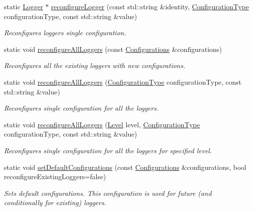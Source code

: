 \begin{DoxyCompactItemize}
static \hyperlink{classel_1_1_logger}{Logger} $\ast$ \hyperlink{classel_1_1_loggers_aef49fdae329cefcc1c01428568dced4b}{reconfigure\+Logger} (const std\+::string \&identity, \hyperlink{namespaceel_a281f5db6d6163678bc68a8b23b59e124}{Configuration\+Type} configuration\+Type, const std\+::string \&value)
\begin{DoxyCompactList}\small\item\em Reconfigures logger\textquotesingle{}s single configuration. \end{DoxyCompactList}\item 
static void \hyperlink{classel_1_1_loggers_ac834df0f5e9e3dab18e70321a2543af7}{reconfigure\+All\+Loggers} (const \hyperlink{classel_1_1_configurations}{Configurations} \&configurations)
\begin{DoxyCompactList}\small\item\em Reconfigures all the existing loggers with new configurations. \end{DoxyCompactList}\item 
static void \hyperlink{classel_1_1_loggers_a1ebd33bc0208b430f41508e34509c7c9}{reconfigure\+All\+Loggers} (\hyperlink{namespaceel_a281f5db6d6163678bc68a8b23b59e124}{Configuration\+Type} configuration\+Type, const std\+::string \&value)
\begin{DoxyCompactList}\small\item\em Reconfigures single configuration for all the loggers. \end{DoxyCompactList}\item 
static void \hyperlink{classel_1_1_loggers_ab24b99e5bb3c907d1418ee3266f15397}{reconfigure\+All\+Loggers} (\hyperlink{namespaceel_ab0ac6091262344c52dd2d3ad099e8e36}{Level} level, \hyperlink{namespaceel_a281f5db6d6163678bc68a8b23b59e124}{Configuration\+Type} configuration\+Type, const std\+::string \&value)
\begin{DoxyCompactList}\small\item\em Reconfigures single configuration for all the loggers for specified level. \end{DoxyCompactList}\item 
static void \hyperlink{classel_1_1_loggers_ab9fb62a8ff904ff887fefde3282f46a4}{set\+Default\+Configurations} (const \hyperlink{classel_1_1_configurations}{Configurations} \&configurations, bool reconfigure\+Existing\+Loggers=false)
\begin{DoxyCompactList}\small\item\em Sets default configurations. This configuration is used for future (and conditionally for existing) loggers. \end{DoxyCompactList}\item 

\end{DoxyCompactItemize}
